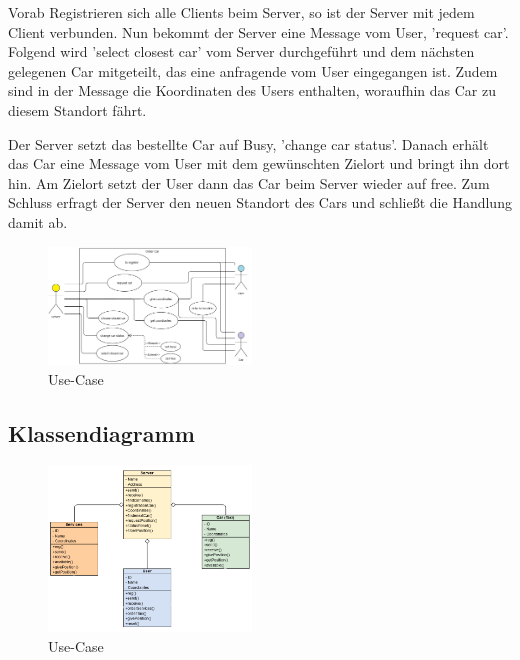 Vorab Registrieren sich alle Clients beim Server, so ist der Server mit jedem Client verbunden. Nun bekommt der Server eine Message vom User, 'request car'.
Folgend wird 'select closest car' vom Server durchgeführt und dem nächsten gelegenen Car mitgeteilt, das eine anfragende vom User eingegangen ist.
Zudem sind in der Message die Koordinaten des Users enthalten, woraufhin das Car zu diesem Standort fährt.

Der Server setzt das bestellte Car auf Busy, 'change car status'.
Danach erhält das Car eine Message vom User mit dem gewünschten Zielort und bringt ihn dort hin. Am Zielort setzt der User dann das Car beim Server wieder auf free.
Zum Schluss erfragt der Server den neuen Standort des Cars und schließt die Handlung damit ab.


\begin{figure}[htbp] 
  \centering
     \includegraphics[width=0.48\textwidth]{Use-Case_Server.png}
     \caption{Use-Case}
\end{figure}

\subsection{Klassendiagramm}


\begin{figure}[htbp] 
  \centering
     \includegraphics[width=0.48\textwidth]{Class_diagramm.png}
     \caption{Use-Case}
\end{figure}
